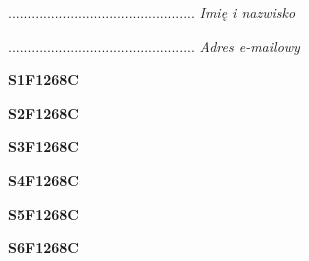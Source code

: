 \begin{turn}{90}\begin{minipage}{\linewidth} \vspace{20mm} ................................................  \textit{Imię i nazwisko}\end{minipage}\end{turn}

\begin{turn}{90}\begin{minipage}{\linewidth} \vspace{20mm} ................................................  \textit{Adres e-mailowy}\end{minipage}\end{turn}

\begin{turn}{90}\huge \begin{minipage}{\linewidth} \vspace{10mm}\textbf{S1F1268C}\end{minipage}\end{turn}

\begin{turn}{90}\huge \begin{minipage}{\linewidth} \vspace{10mm}\textbf{S2F1268C}\end{minipage}\end{turn}

\begin{turn}{90}\huge \begin{minipage}{\linewidth} \vspace{10mm}\textbf{S3F1268C}\end{minipage}\end{turn}

\begin{turn}{90}\huge \begin{minipage}{\linewidth} \vspace{10mm}\textbf{S4F1268C}\end{minipage}\end{turn}

\begin{turn}{90}\huge \begin{minipage}{\linewidth} \vspace{10mm}\textbf{S5F1268C}\end{minipage}\end{turn}

\begin{turn}{90}\huge \begin{minipage}{\linewidth} \vspace{10mm}\textbf{S6F1268C}\end{minipage}\end{turn}

